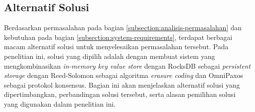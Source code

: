 \subsection{Alternatif Solusi}
\label{subsection:alternatif-solusi}

Berdasarkan permasalahan pada bagian \ref{subsection:analisis-permasalahan} dan kebutuhan pada bagian \ref{subsection:system-requirements}, terdapat berbagai macam alternatif solusi untuk menyelesaikan permasalahan tersebut. Pada penelitian ini, solusi yang dipilih adalah dengan membuat sistem yang mengkombinasikan \textit{in-memory key value store} dengan RocksDB sebagai \textit{persistent storage} dengan Reed-Solomon sebagai algoritma \textit{erasure coding} dan OmniPaxos sebagai protokol konsensus. Bagian ini akan menjelaskan alternatif solusi yang dipertimbangkan, perbandingan solusi tersebut, serta alasan pemilihan solusi yang digunakan dalam penelitian ini.







